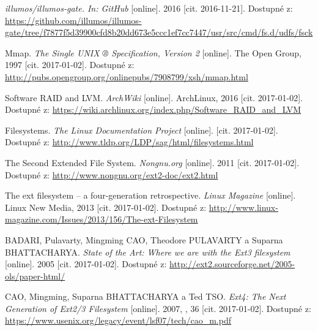 \begin{literatura}{99}
    \emph{illumos/illumos-gate. In: GitHub}\/ [online]. 2016 [cit. 2016-11-21]. Dostupné z: \url{https://github.com/illumos/illumos-gate/tree/f7877f5d39900cfd8b20dd673e5ccc1ef7cc7447/usr/src/cmd/fs.d/udfs/fsck} 

    Mmap. \emph{The Single UNIX ® Specification, Version 2} [online]. The Open Group, 1997 [cit. 2017-01-02]. Dostupné z: \url{http://pubs.opengroup.org/onlinepubs/7908799/xsh/mmap.html}

    Software RAID and LVM. \emph{ArchWiki} [online]. ArchLinux, 2016 [cit. 2017-01-02]. Dostupné z: \url{https://wiki.archlinux.org/index.php/Software_RAID_and_LVM}

    Filesystems. \emph{The Linux Documentation Project} [online]. [cit. 2017-01-02]. Dostupné z: \url{http://www.tldp.org/LDP/sag/html/filesystems.html}

    The Second Extended File System. \emph{Nongnu.org} [online]. 2011 [cit. 2017-01-02]. Dostupné z: \url{http://www.nongnu.org/ext2-doc/ext2.html}

    The ext filesystem – a four-generation retrospective. \emph{Linux Magazine} [online]. Linux New Media, 2013 [cit. 2017-01-02]. Dostupné z: \url{http://www.linux-magazine.com/Issues/2013/156/The-ext-Filesystem}

    BADARI, Pulavarty, Mingming CAO, Theodore PULAVARTY a Suparna BHATTACHARYA. \emph{State of the Art: Where we are with the Ext3 filesystem} [online]. 2005 [cit. 2017-01-02]. Dostupné z: \url{http://ext2.sourceforge.net/2005-ols/paper-html/}

    CAO, Mingming, Suparna BHATTACHARYA a Ted TSO. \emph{Ext4: The Next Generation of  Ext2/3 Filesystem} [online]. 2007, , 36 [cit. 2017-01-02]. Dostupné z: \url{https://www.usenix.org/legacy/event/lsf07/tech/cao_m.pdf}


\end{literatura}
